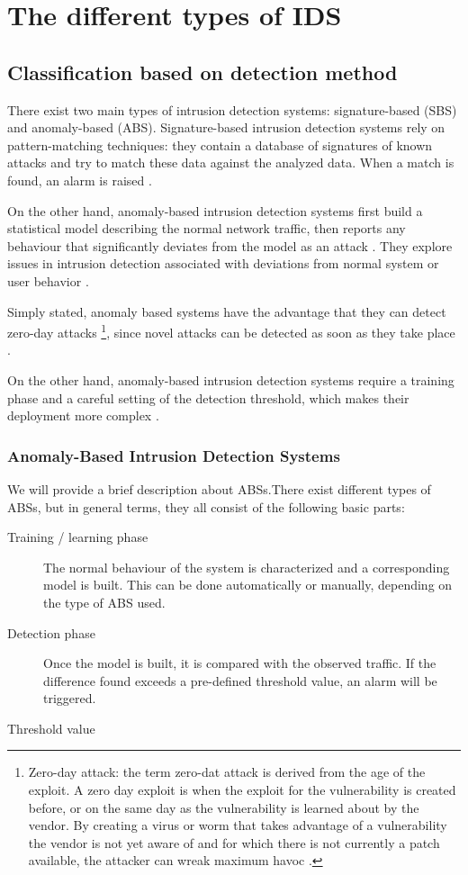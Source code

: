 \section{The different types of IDS}

\subsection{Classification based on detection method}

There exist two main types of intrusion detection systems: signature-based (SBS) and anomaly-based (ABS). Signature-based intrusion detection systems rely on pattern-matching techniques: they contain a database of signatures of known attacks and try to match these data against the analyzed data. When a match is found, an alarm is raised \citep{Roberto}.

On the other hand, anomaly-based intrusion detection systems first build
a statistical model describing the normal network traffic, then reports any behaviour that significantly deviates from the model as an attack \citep{Roberto}. They explore issues in intrusion detection associated with deviations from normal system or user behavior \citep{windowssecurity2}.

Simply stated, anomaly based systems have the advantage that they can detect zero-day attacks \footnote{Zero-day attack: the term zero-dat attack is derived from the age of the exploit. A zero day exploit is when the exploit for the vulnerability is created before, or on the same day as the vulnerability is learned about by the vendor. By creating a virus or worm that takes advantage of a vulnerability the vendor is not yet aware of and for which there is not currently a patch available, the attacker can wreak maximum havoc \citep{Zero}.}, since novel attacks can be detected as soon as they take place \citep{Roberto}.

On the other hand, anomaly-based intrusion detection systems require a training phase and a careful setting of the detection threshold, which makes their deployment more complex \citep{Roberto}.

\subsubsection{Anomaly-Based Intrusion Detection Systems}

We will provide a brief description about ABSs.There exist different types of ABSs, but in general terms, they all consist of the following basic parts:
\begin{description}
\item[Training / learning phase] The normal behaviour of the system is characterized and a corresponding model is built. This can be done automatically or manually, depending on the type of ABS used.
\item[Detection phase] Once the model is built, it is compared with the observed traffic. If the difference found exceeds a pre-defined threshold value, an alarm will be triggered.
\item[Threshold value]
\end{description}

